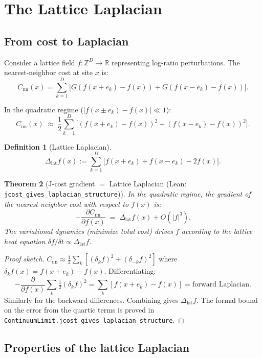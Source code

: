 \documentclass[11pt,a4paper]{article}
\theoremstyle{plain}
\newtheorem{theorem}{Theorem}[section]
\theoremstyle{definition}
\newtheorem{definition}[theorem]{Definition}
\theoremstyle{remark}
\newcommand{\R}{\mathbb{R}}
\newcommand{\Z}{\mathbb{Z}}
\newcommand{\Jlog}{G}
\newcommand{\Lap}{\Delta_{\mathrm{lat}}}
\begin{document}
\section{The Lattice Laplacian}
\label{sec:laplacian}

\subsection{From cost to Laplacian}

Consider a lattice field $f : \Z^D \to \R$ representing log-ratio
perturbations.  The nearest-neighbor cost at site $x$ is:
\[
  C_{\text{nn}}(x)
  = \sum_{k=1}^D \bigl[\Jlog(f(x+e_k) - f(x)) + \Jlog(f(x-e_k) - f(x))\bigr].
\]

In the quadratic regime ($|f(x \pm e_k) - f(x)| \ll 1$):
\[
  C_{\text{nn}}(x) \;\approx\; \frac{1}{2}\sum_{k=1}^D
  \bigl[(f(x+e_k) - f(x))^2 + (f(x-e_k) - f(x))^2\bigr].
\]

\begin{definition}[Lattice Laplacian]
\[
  \Lap f(x) := \sum_{k=1}^D \bigl[f(x+e_k) + f(x-e_k) - 2f(x)\bigr].
\]
\end{definition}

\begin{theorem}[J-cost gradient $=$ Lattice Laplacian {\normalfont (Lean: \texttt{jcost\_gives\_laplacian\_structure})}]
\label{thm:jcost-laplacian}
In the quadratic regime, the gradient of the nearest-neighbor cost
with respect to $f(x)$ is:
\[
  -\frac{\partial C_{\text{nn}}}{\partial f(x)} \;=\; \Lap f(x) + O(|f|^3).
\]
The variational dynamics (minimize total cost) drives $f$ according to
the lattice heat equation $\delta f / \delta t \propto \Lap f$.
\end{theorem}

\begin{proof}[Proof sketch]
$C_{\text{nn}} \approx \frac{1}{2}\sum_k [(\delta_k f)^2 + (\delta_{-k} f)^2]$
where $\delta_k f(x) = f(x+e_k) - f(x)$.  Differentiating:
\[
  -\frac{\partial}{\partial f(x)} \sum_k \tfrac12(\delta_k f)^2
  = \sum_k [f(x+e_k) - f(x)] = \text{forward Laplacian}.
\]
Similarly for the backward differences.  Combining gives $\Lap f$.
The formal bound on the error from the quartic terms is proved in
\texttt{ContinuumLimit.jcost\_gives\_laplacian\_structure}.
\end{proof}

\subsection{Properties of the lattice Laplacian}
\end{document}
